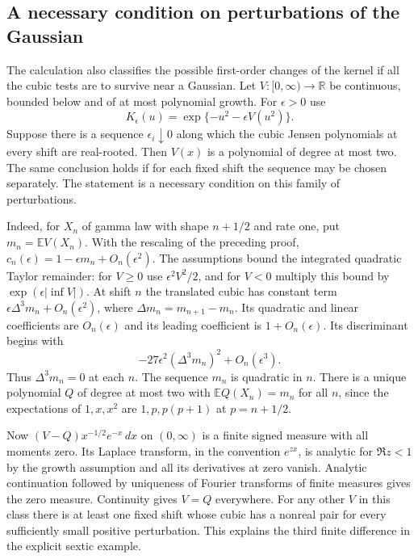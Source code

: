\subsection{A necessary condition on perturbations of the Gaussian}
The calculation also classifies the possible first-order changes of the kernel if all the cubic tests are to survive near a Gaussian. Let $V:[0,\infty)\to\mathbb R$ be continuous, bounded below and of at most polynomial growth. For $\epsilon>0$ use
\[
 K_\epsilon(u)=\exp\{-u^2-\epsilon V(u^2)\}.
\]
Suppose there is a sequence $\epsilon_i\downarrow0$ along which the cubic Jensen polynomials at every shift are real-rooted. Then $V(x)$ is a polynomial of degree at most two. The same conclusion holds if for each fixed shift the sequence may be chosen separately. The statement is a necessary condition on this family of perturbations.

Indeed, for $X_n$ of gamma law with shape $n+1/2$ and rate one, put $m_n=\mathbb E V(X_n)$. With the rescaling of the preceding proof,
$c_n(\epsilon)=1-\epsilon m_n+O_n(\epsilon^2)$. The assumptions bound the integrated quadratic Taylor remainder: for $V\ge0$ use $\epsilon^2 V^2/2$, and for $V<0$ multiply this bound by $\exp(\epsilon|\inf V|)$. At shift $n$ the translated cubic has constant term $\epsilon\Delta^3m_n+O_n(\epsilon^2)$, where $\Delta m_n=m_{n+1}-m_n$. Its quadratic and linear coefficients are $O_n(\epsilon)$ and its leading coefficient is $1+O_n(\epsilon)$. Its discriminant begins with
\[
                   -27\epsilon^2(\Delta^3m_n)^2+O_n(\epsilon^3).
\]
Thus $\Delta^3m_n=0$ at each $n$. The sequence $m_n$ is quadratic in $n$. There is a unique polynomial $Q$ of degree at most two with $\mathbb E Q(X_n)=m_n$ for all $n$, since the expectations of $1,x,x^2$ are $1,p,p(p+1)$ at $p=n+1/2$.

Now $(V-Q)x^{-1/2}e^{-x}\,dx$ on $(0,\infty)$ is a finite signed measure with all moments zero. Its Laplace transform, in the convention $e^{zx}$, is analytic for $\Re z<1$ by the growth assumption and all its derivatives at zero vanish. Analytic continuation followed by uniqueness of Fourier transforms of finite measures gives the zero measure. Continuity gives $V=Q$ everywhere. For any other $V$ in this class there is at least one fixed shift whose cubic has a nonreal pair for every sufficiently small positive perturbation. This explains the third finite difference in the explicit sextic example.
